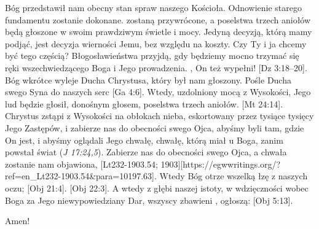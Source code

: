 Bóg przedstawił nam obecny stan spraw naszego Kościoła. Odnowienie starego fundamentu zostanie dokonane.  zostaną przywrócone, a poselstwa trzech aniołów będą głoszone w swoim prawdziwym świetle i mocy. Jedyną decyzją, którą mamy podjąć, jest decyzja wierności Jemu, bez względu na koszty. Czy Ty i ja chcemy być tego częścią? Błogosławieństwa przyjdą, gdy będziemy mocno trzymać się ręki wszechwiedzącego Boga i Jego prowadzenia. , On też wypełni! [Dz 3:18--20]. Bóg wkrótce wyleje Ducha Chrystusa, który był nam głoszony. Pośle Ducha swego Syna do naszych serc [Ga 4:6]. Wtedy, uzdolniony mocą z Wysokości, Jego lud będzie głosił, donośnym głosem, poselstwa trzech aniołów. [Mt 24:14]. Chrystus zstąpi z Wysokości na obłokach nieba, eskortowany przez tysiące tysięcy Jego Zastępów, i zabierze nas do obecności swego Ojca, abyśmy byli tam, gdzie On jest, i abyśmy oglądali Jego chwałę, chwałę, którą miał u Boga, zanim powstał świat (\textit{J 17:24,5}). Zabierze nas do obecności swego Ojca, a chwała zostanie nam objawiona, [Lt232-1903.54; 1903][https://egwwritings.org/?ref=en\_Lt232-1903.54&para=10197.63]. Wtedy Bóg otrze wszelką łzę z naszych oczu; [Obj 21:4]. [Obj 22:3]. A wtedy z głębi naszej istoty, w wdzięczności wobec Boga za Jego niewypowiedziany Dar, wszyscy zbawieni , ogłoszą: [Obj 5:13].

Amen!

